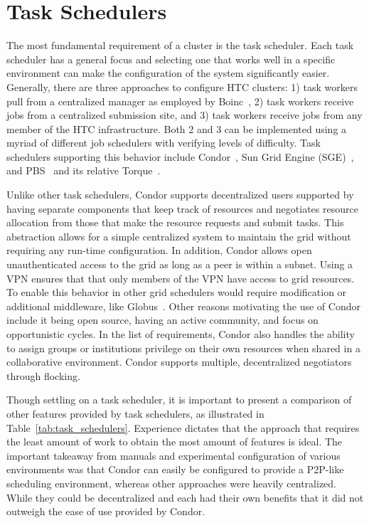 \section{Task Schedulers}
The most fundamental requirement of a cluster is the task scheduler.  Each
task scheduler has a general focus and selecting one that works well in a
specific environment can make the configuration of the system significantly
easier.  Generally, there are three approaches to configure HTC clusters: 1)
task workers pull from a centralized manager as employed by Boinc~\cite{boinc},
2) task workers receive jobs from a centralized submission site, and 3) task
workers receive jobs from any member of the HTC infrastructure.  Both 2 and 3
can be implemented using a myriad of different job schedulers with verifying
levels of difficulty.  Task schedulers supporting this behavior include
Condor~\cite{condor0}, Sun Grid Engine (SGE)~\cite{grid_engine}, and
PBS~\cite{pbs1, pbs0} and its relative Torque~\cite{torque}.

Unlike other task schedulers, Condor supports decentralized users supported
by having separate components that keep track of resources and negotiates
resource allocation from those that make the resource requests and submit
tasks.  This abstraction allows for a simple centralized system to maintain the
grid without requiring any run-time configuration.  In addition, Condor allows
open unauthenticated access to the grid as long as a peer is within a subnet.
Using a VPN ensures that that only members of the VPN have access to grid
resources.  To enable this behavior in other grid schedulers would require
modification or additional middleware, like Globus~\cite{globus_toolkit}.
Other reasons motivating the use of Condor include it being open source, having
an active community, and focus on opportunistic cycles.  In the list of
requirements, Condor also handles the ability to assign groups or institutions
privilege on their own resources when shared in a collaborative environment.
Condor supports multiple, decentralized negotiators through flocking.

Though settling on a task scheduler, it is important to present a comparison
of other features provided by task schedulers, as illustrated in
Table~\ref{tab:task_schedulers}.  Experience dictates that the approach
that requires the least amount of work to obtain the most amount of features is
ideal.  The important takeaway from manuals and experimental configuration of
various environments was that Condor can easily be configured to provide a
P2P-like scheduling environment, whereas other approaches were heavily
centralized.  While they could be decentralized and each had their own benefits
that it did not outweigh the ease of use provided by Condor.

